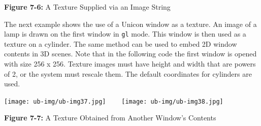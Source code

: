 {\sffamily\bfseries Figure 7-6:}
{\sffamily A Texture Supplied via an Image String}

\bigskip


The next example shows the use of a Unicon window as a texture. An
image of a lamp is drawn on the first window in \texttt{gl} mode. This
window is then used as a texture on a cylinder. The same method can be
used to embed 2D window contents in 3D scenes. Note that in the
following code the first window is opened with size 256 x 256. Texture
images must have height and width that are powers of 2, or the system
must rescale them. The default coordinates for cylinders are used.

{\centering\color{green}
 \texttt{[image: ub-img/ub-img37.jpg]}
\texttt{ \ \ }
\texttt{[image: ub-img/ub-img38.jpg]}
\texttt{ \ \ }
\par}

{\sffamily\bfseries Figure 7-7:}
{\sffamily A Texture Obtained from Another Window's Contents}

\bigskip

